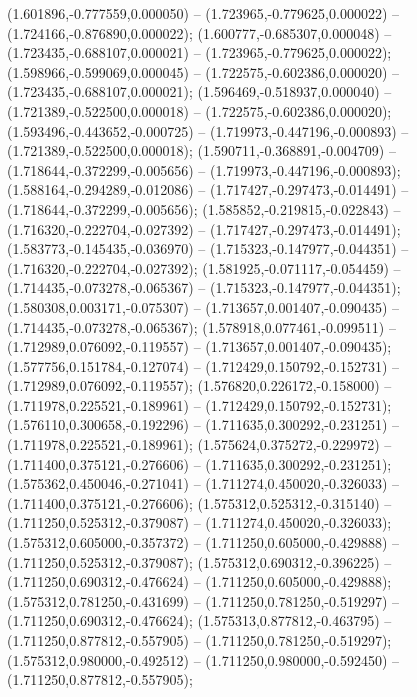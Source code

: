  (1.601896,-0.777559,0.000050) -- (1.723965,-0.779625,0.000022) -- (1.724166,-0.876890,0.000022);
 (1.600777,-0.685307,0.000048) -- (1.723435,-0.688107,0.000021) -- (1.723965,-0.779625,0.000022);
 (1.598966,-0.599069,0.000045) -- (1.722575,-0.602386,0.000020) -- (1.723435,-0.688107,0.000021);
 (1.596469,-0.518937,0.000040) -- (1.721389,-0.522500,0.000018) -- (1.722575,-0.602386,0.000020);
 (1.593496,-0.443652,-0.000725) -- (1.719973,-0.447196,-0.000893) -- (1.721389,-0.522500,0.000018);
 (1.590711,-0.368891,-0.004709) -- (1.718644,-0.372299,-0.005656) -- (1.719973,-0.447196,-0.000893);
 (1.588164,-0.294289,-0.012086) -- (1.717427,-0.297473,-0.014491) -- (1.718644,-0.372299,-0.005656);
 (1.585852,-0.219815,-0.022843) -- (1.716320,-0.222704,-0.027392) -- (1.717427,-0.297473,-0.014491);
 (1.583773,-0.145435,-0.036970) -- (1.715323,-0.147977,-0.044351) -- (1.716320,-0.222704,-0.027392);
 (1.581925,-0.071117,-0.054459) -- (1.714435,-0.073278,-0.065367) -- (1.715323,-0.147977,-0.044351);
 (1.580308,0.003171,-0.075307) -- (1.713657,0.001407,-0.090435) -- (1.714435,-0.073278,-0.065367);
 (1.578918,0.077461,-0.099511) -- (1.712989,0.076092,-0.119557) -- (1.713657,0.001407,-0.090435);
 (1.577756,0.151784,-0.127074) -- (1.712429,0.150792,-0.152731) -- (1.712989,0.076092,-0.119557);
 (1.576820,0.226172,-0.158000) -- (1.711978,0.225521,-0.189961) -- (1.712429,0.150792,-0.152731);
 (1.576110,0.300658,-0.192296) -- (1.711635,0.300292,-0.231251) -- (1.711978,0.225521,-0.189961);
 (1.575624,0.375272,-0.229972) -- (1.711400,0.375121,-0.276606) -- (1.711635,0.300292,-0.231251);
 (1.575362,0.450046,-0.271041) -- (1.711274,0.450020,-0.326033) -- (1.711400,0.375121,-0.276606);
 (1.575312,0.525312,-0.315140) -- (1.711250,0.525312,-0.379087) -- (1.711274,0.450020,-0.326033);
 (1.575312,0.605000,-0.357372) -- (1.711250,0.605000,-0.429888) -- (1.711250,0.525312,-0.379087);
 (1.575312,0.690312,-0.396225) -- (1.711250,0.690312,-0.476624) -- (1.711250,0.605000,-0.429888);
 (1.575312,0.781250,-0.431699) -- (1.711250,0.781250,-0.519297) -- (1.711250,0.690312,-0.476624);
 (1.575313,0.877812,-0.463795) -- (1.711250,0.877812,-0.557905) -- (1.711250,0.781250,-0.519297);
 (1.575312,0.980000,-0.492512) -- (1.711250,0.980000,-0.592450) -- (1.711250,0.877812,-0.557905);
